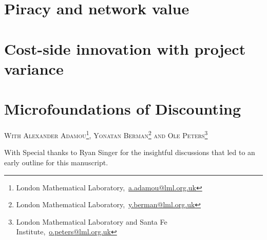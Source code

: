 \documentclass[12pt,twoside]{report}
\makeatletter
\numberwithin{equation}{section}
\newcommand{\chapterauthor}[1]{%
  {\parindent0pt\vspace*{-25pt}%
  \linespread{1.1}\large\scshape#1%
  \par\nobreak\vspace*{35pt}}
  \@afterheading%
}
\makeatother
\begin{document}
\chapter{Piracy and network value}


\chapter{Cost-side innovation with project variance}


\chapter{Microfoundations of Discounting}
\chapterauthor{With Alexander Adamou\footnote{London Mathematical Laboratory,~\url{a.adamou@lml.org.uk}}, Yonatan Berman\footnote{London Mathematical Laboratory,~\url{y.berman@lml.org.uk}} and Ole Peters\footnote{London Mathematical Laboratory and Santa Fe Institute,~\url{o.peters@lml.org.uk}}}
With Special thanks to Ryan Singer for the insightful discussions that led to an early outline for this manuscript.


\end{document}
